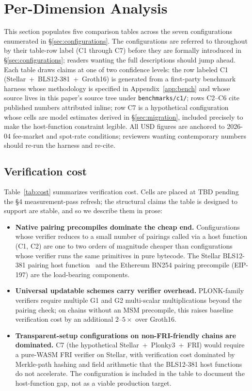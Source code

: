 \section{Per-Dimension Analysis}
\label{sec:analysis}

This section populates five comparison tables across the seven
configurations enumerated in \S\ref{sec:configurations}. The
configurations are referred to throughout by their table-row label
(C1 through C7) before they are formally introduced in
\S\ref{sec:configurations}; readers wanting the full descriptions
should jump ahead. Each table draws claims at one of two confidence
levels: the row labeled C1 (Stellar~+~BLS12-381~+~Groth16) is
generated from a first-party benchmark harness whose methodology is
specified in Appendix~\ref{app:bench} and whose source lives in this
paper's source tree under \texttt{benchmarks/c1/}; rows C2--C6 cite
published numbers attributed inline; row C7 is
a hypothetical configuration whose cells are model estimates derived
in \S\ref{sec:migration}, included precisely to make the
host-function constraint legible. All USD figures are anchored to
2026-04 fee-market and spot-rate conditions; reviewers wanting
contemporary numbers should re-run the harness and re-cite.

\subsection{Verification cost}
\label{sec:analysis-cost}

Table~\ref{tab:cost} summarizes verification cost. Cells are placed
at TBD pending the §4 measurement-pass refresh; the structural claims
the table is designed to support are stable, and so we describe them
in prose:

\begin{itemize}
  \item \textbf{Native pairing precompiles dominate the cheap end.}
    Configurations whose verifier reduces to a small number of
    pairings called via a host function (C1, C2) are one to two
    orders of magnitude cheaper than configurations whose verifier
    runs the same primitives in pure bytecode. The Stellar
    BLS12-381 pairing host function~\cite{stellar-cap-0059} and the
    Ethereum BN254 pairing precompile (EIP-197) are the load-bearing
    components.
  \item \textbf{Universal updatable schemes carry verifier overhead.}
    PLONK-family verifiers require multiple G1 and G2 multi-scalar
    multiplications beyond the pairing check; on chains without an
    MSM precompile, this raises baseline verification cost by an
    additional $2$--$5\times$ over Groth16.
  \item \textbf{Transparent-setup configurations on
    non-FRI-friendly chains are dominated.} C7 (the hypothetical
    Stellar~+~Plonky3~+~FRI) would require a pure-WASM FRI verifier
    on Stellar, with verification cost dominated by Merkle-path
    hashing and field arithmetic that the BLS12-381 host functions
    do not accelerate. The configuration is included in the table to
    document the host-function gap, not as a viable production
    target.
\end{itemize}

